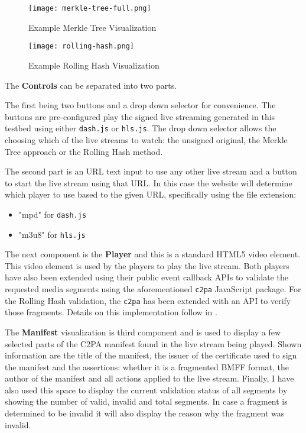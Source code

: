 \begin{figure}
    \texttt{[image: merkle-tree-full.png]}
    \caption{Example Merkle Tree Visualization}
    \label{fig:merkle_tree}
\end{figure}
\begin{figure}
    \texttt{[image: rolling-hash.png]}
    \caption{Example Rolling Hash Visualization}
    \label{fig:rolling_hash}
\end{figure}

The \textbf{Controls} can be separated into two parts. 

The first being two buttons and a drop down selector for convenience. The buttons are pre-configured play the signed live streaming generated in this testbed using either \texttt{dash.js} or \texttt{hls.js}. The drop down selector allows the choosing which of the live streams to watch: the unsigned original, the Merkle Tree approach or the Rolling Hash method.

The second part is an URL text input to use any other live stream and a button to start the live stream using that URL. In this case the website will determine which player to use based to the given URL, specifically using the file extension:

\begin{itemize}
    \item "mpd" for \texttt{dash.js}
    \item "m3u8" for \texttt{hls.js}
\end{itemize}

The next component is the \textbf{Player} and this is a standard HTML5 video element. This video element is used by the players to play the live stream. Both players have also been extended using their public event callback APIs to validate the requested media segments using the aforementioned \texttt{c2pa} JavaScript package. For the Rolling Hash validation, the \texttt{c2pa} has been extended with an API to verify those fragments. Details on this implementation follow in .

The \textbf{Manifest} visualization is third component and is used to display a few selected parts of the C2PA manifest found in the live stream being played. Shown information are the title of the manifest, the issuer of the certificate used to sign the manifest and the assertions: whether it is a fragmented BMFF format, the author of the manifest and all actions applied to the live stream. Finally, I have also used this space to display the current validation status of all segments by showing the number of valid, invalid and total segments. In case a fragment is determined to be invalid it will also display the reason why the fragment was invalid.

